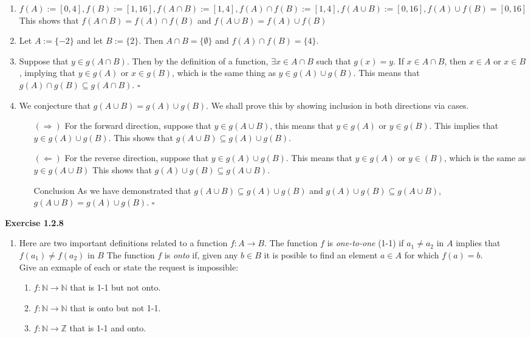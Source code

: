 \documentclass[12 pt]{article}
\newcommand{\qed}[0]{$\square$}
\begin{document}
\begin{enumerate}
    \item \(f(A) := [0, 4], f(B) := [1, 16], f(A \cap B) := [1, 4], f(A) \cap f(B) := [1, 4], f(A\cup B) := [0, 16], f(A) \cup f(B) = [0, 16]\)
    \\
    This shows that \(f(A \cap B) = f(A) \cap f(B)\) and \(f(A \cup B) = f(A) \cup f(B)\)

    \item Let \(A := \{-2\}\) and let \(B := \{2\}\). Then \(A \cap B = \{\emptyset\}\) and \(f(A) \cap f(B) = \{4\}\).
    \item Suppose that \(y \in g(A \cap B)\). Then by the definition of a function, \(\exists x \in A \cap B\) such that \(g(x) = y\). If \(x \in A \cap B\), then \(x \in A\) or \(x \in B\), implying that \(y \in g(A)\) or \(x \in g(B)\), which is the same thing as \(y \in g(A) \cup g(B)\). This means that \(g(A) \cap g(B) \subseteq g(A \cap B)\). \qed 
    \item We conjecture that \(g(A \cup B) = g(A) \cup g(B)\). We shall prove this by showing inclusion in both directions via cases.
    \begin{enumerate}
        \item[\((\Rightarrow)\)] For the forward direction, suppose that \(y \in g(A \cup B)\), this means that \(y \in g(A)\) or \(y \in g(B)\). This implies that \(y \in g(A) \cup g(B)\). This shows that \(g(A \cup B) \subseteq g(A) \cup g(B)\).
        \item[\((\Leftarrow)\)] For the reverse direction, suppose that \(y \in g(A) \cup g(B)\). This means that \(y \in g(A)\) or \(y \in (B)\), which is the same as \(y \in g(A \cup B)\) This shows that \(g(A) \cup g(B) \subseteq g(A \cup B)\).
        \item[Conclusion] As we have demonstrated that \(g(A \cup B) \subseteq g(A) \cup g(B)\) and \(g(A) \cup g(B) \subseteq g(A \cup B)\), \(g(A \cup B) = g(A) \cup g(B)\). \qed
    \end{enumerate}
\end{enumerate}
\textbf{Exercise 1.2.8}
\begin{enumerate}
    \item Here are two important definitions related to a function \(f \colon A \to B\). The function \(f\) is \textit{one-to-one} (1-1) if \(a_{1} \neq a_{2}\) in \(A\) implies that \(f(a_{1}) \neq f(a_{2})\) in \(B\) The function \(f\) is \textit{onto} if, given any \(b \in B\) it is posible to find an element \(a \in A\) for which \(f(a) = b\).
    \\
    Give an exmaple of each or state the request is impossible:
    \begin{enumerate}
    \item \(f \colon \mathbb{N} \to \mathbb{N}\) that is 1-1 but not onto.
    \item \(f \colon \mathbb{N} \to \mathbb{N}\) that is onto but not 1-1.
    \item \(f \colon \mathbb{N} \to \mathbb{Z}\) that is 1-1 and onto.
    \end{enumerate}
\end{enumerate}
\end{document}
